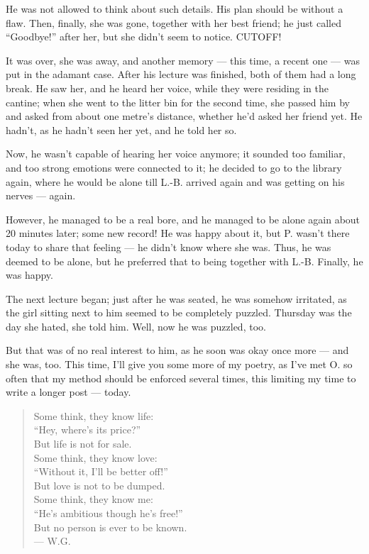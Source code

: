 He was not allowed to think about such details. 
His plan should be without a flaw. 
Then, finally, she was gone, together with her best friend; he just called \enquote{Goodbye!} after her, but she didn't seem to notice. 
CUTOFF!

It was over, she was away, and another memory --- this time, a recent one --- was put in the adamant case. 
After his lecture was finished, both of them had a long break. He saw her, and he heard her voice, while they were residing in the cantine; when she went to the litter bin for the second time, she passed him by and asked from about one metre's distance, whether he'd asked her friend yet. He hadn't, as he hadn't seen her yet, and he told her so.

Now, he wasn't capable of hearing her voice anymore; it sounded too familiar, and too strong emotions were connected to it; he decided to go to the library again, where he would be alone till L.-B. arrived again and was getting on his nerves --- again.

However, he managed to be a real bore, and he managed to be alone again about 20 minutes later; some new record!
He was happy about it, but P. wasn't there today to share that feeling --- he didn't know where she was. 
Thus, he was deemed to be alone, but he preferred that to being together with L.-B. 
Finally, he was happy.

The next lecture began; just after he was seated, he was somehow irritated, as the girl sitting next to him seemed to be completely puzzled. Thursday was the day she hated, she told him. Well, now he was puzzled, too.

But that was of no real interest to him, as he soon was okay once more --- and she was, too. 
This time, I'll give you some more of my poetry, as I've met O. so often that my method should be enforced several times, this limiting my time to write a longer post --- today. 

\begin{quote}
Some think, they know life:\\
\enquote{Hey, where's its price?}\\
But life is not for sale.\\
Some think, they know love:\\
\enquote{Without it, I'll be better off!}\\
But love is not to be dumped.\\
Some think, they know me:\\
\enquote{He's ambitious though he's free!}\\
But no person is ever to be known. \\
--- W.G.
\end{quote}

